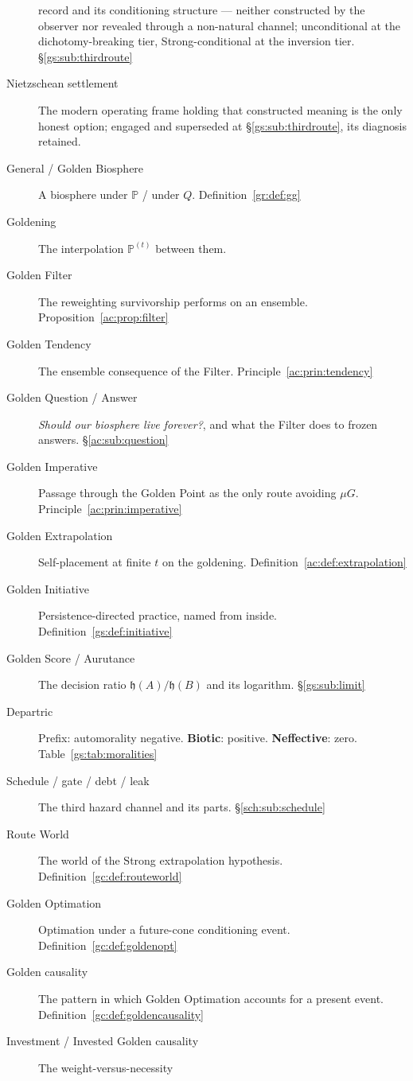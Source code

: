\documentclass[11pt]{article}
\numberwithin{equation}{section}
\theoremstyle{plain}
\theoremstyle{definition}
\theoremstyle{remark}
\newcommand{\PP}{\mathbb{P}}
\newcommand{\hm}{\mathfrak{h}}
\begin{document}
\begin{description}
record and its conditioning structure --- neither constructed by the
observer nor revealed through a non-natural channel; unconditional at
the dichotomy-breaking tier, Strong-conditional at the inversion
tier. \S\ref{gs:sub:thirdroute}
\item[Nietzschean settlement] The modern operating frame holding that
constructed meaning is the only honest option; engaged and superseded
at \S\ref{gs:sub:thirdroute}, its diagnosis retained.
\item[General / Golden Biosphere] A biosphere under $\PP$ / under $Q$.
Definition~\ref{gr:def:gg}
\item[Goldening] The interpolation $\PP^{(t)}$ between them.
\item[Golden Filter] The reweighting survivorship performs on an
ensemble. Proposition~\ref{ac:prop:filter}
\item[Golden Tendency] The ensemble consequence of the Filter.
Principle~\ref{ac:prin:tendency}
\item[Golden Question / Answer] \emph{Should our biosphere live
forever?}, and what the Filter does to frozen answers.
\S\ref{ac:sub:question}
\item[Golden Imperative] Passage through the Golden Point as the only
route avoiding $\mu G$. Principle~\ref{ac:prin:imperative}
\item[Golden Extrapolation] Self-placement at finite $t$ on the
goldening. Definition~\ref{ac:def:extrapolation}
\item[Golden Initiative] Persistence-directed practice, named from
inside. Definition~\ref{gs:def:initiative}
\item[Golden Score / Aurutance] The decision ratio $\hm(A)/\hm(B)$ and
its logarithm. \S\ref{gs:sub:limit}
\item[Departric] Prefix: automorality negative. \textbf{Biotic}:
positive. \textbf{Neffective}: zero. Table~\ref{gs:tab:moralities}
\item[Schedule / gate / debt / leak] The third hazard channel and its
parts. \S\ref{sch:sub:schedule}
\item[Route World] The world of the Strong extrapolation hypothesis.
Definition~\ref{gc:def:routeworld}
\item[Golden Optimation] Optimation under a future-cone conditioning
event. Definition~\ref{gc:def:goldenopt}
\item[Golden causality] The pattern in which Golden Optimation accounts
for a present event. Definition~\ref{gc:def:goldencausality}
\item[Investment / Invested Golden causality] The weight-versus-necessity

\end{description}
\end{document}

